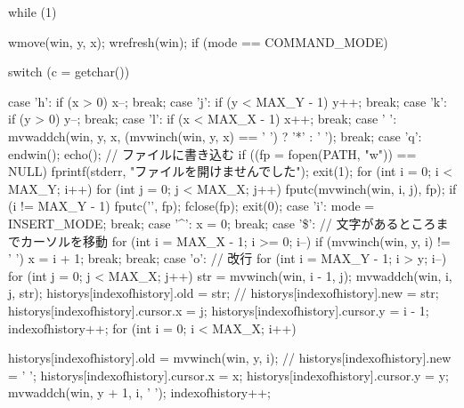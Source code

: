 \documentclass[a4paper,11pt]{jsarticle}
\begin{document}
{    while (1)
    {
        wmove(win, y, x);
        wrefresh(win);
        if (mode == COMMAND_MODE)
        {
            switch (c = getchar())
            {
            case 'h':
                if (x > 0)
                    x--;
                break;
            case 'j':
                if (y < MAX_Y - 1)
                    y++;
                break;
            case 'k':
                if (y > 0)
                    y--;
                break;
            case 'l':
                if (x < MAX_X - 1)
                    x++;
                break;
            case ' ':
                mvwaddch(win, y, x, (mvwinch(win, y, x) == ' ') ? '*' : ' ');
                break;
            case 'q':
                endwin();
                echo();
                // ファイルに書き込む
                if ((fp = fopen(PATH, "w")) == NULL)
                {
                    fprintf(stderr, "ファイルを開けませんでした\n");
                    exit(1);
                }
                for (int i = 0; i < MAX_Y; i++)
                {
                    for (int j = 0; j < MAX_X; j++)
                    {
                        fputc(mvwinch(win, i, j), fp);
                    }
                    if (i != MAX_Y - 1)
                    {
                        fputc('\n', fp);
                    }
                }
                fclose(fp);
                exit(0);
            case 'i':
                mode = INSERT_MODE;
                break;
            case '^':
                x = 0;
                break;
            case '\$':
                // 文字があるところまでカーソルを移動
                for (int i = MAX_X - 1; i >= 0; i--)
                {
                    if (mvwinch(win, y, i) != ' ')
                    {
                        x = i + 1;
                        break;
                    }
                }
                break;
            case 'o':
                // 改行
                for (int i = MAX_Y - 1; i > y; i--)
                {
                    for (int j = 0; j < MAX_X; j++)
                    {
                        str = mvwinch(win, i - 1, j);
                        mvwaddch(win, i, j, str);
                        historys[indexofhistory].old = str;
                        // historys[indexofhistory].new = str;
                        historys[indexofhistory].cursor.x = j;
                        historys[indexofhistory].cursor.y = i - 1;
                        indexofhistory++;
                    }
                }
                for (int i = 0; i < MAX_X; i++)                {
                    historys[indexofhistory].old = mvwinch(win, y, i);
                    // historys[indexofhistory].new = ' ';
                    historys[indexofhistory].cursor.x = x;
                    historys[indexofhistory].cursor.y = y;
                    mvwaddch(win, y + 1, i, ' ');
                    indexofhistory++;

}}}}}
\end{document}
